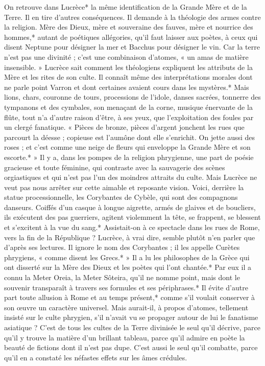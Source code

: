 \documentclass[a4paper, 11pt, oneside, polutonikogreek, french]{article}
\begin{document}
On retrouve dans Lucrèce* la même identification de la Grande Mère et de la Terre. Il en tire d'autres conséquences. Il demande à la théologie des armes contre la religion. Mère des Dieux, mère et souveraine des fauves, mère et nourrice des hommes,* autant de poétiques allégories, qu'il faut laisser aux poètes, à ceux qui disent Neptune pour désigner la mer et Bacchus pour désigner le vin. Car la terre n'est pas une divinité ; c'est une combinaison d'atomes, « un amas de matière insensible. » Lucrèce sait comment les théologiens expliquent les attributs de la Mère et les rites de son culte. Il connaît même des interprétations morales dont ne parle point Varron et dont certaines avaient cours dans les mystères.* Mais lions, chars, couronne de tours, processions de l'idole, danses sacrées, tonnerre des tympanons et des cymbales, son menaçant de la corne, musique énervante de la flûte, tout n'a d'autre raison d'être, à ses yeux, que l'exploitation des foules par un clergé fanatique. « Pièces de bronze, pièces d'argent jonchent les rues que parcourt la déesse ; copieuse est l'aumône dont elle s'enrichit. On jette aussi des roses ; et c'est comme une neige de fleurs qui enveloppe la Grande Mère et son escorte.* » Il y a, dans les pompes de la religion phrygienne, une part de poésie gracieuse et toute féminine, qui contraste avec la sauvagerie des scènes orgiastiques et qui n'est pas l'un des moindres attraits du culte. Mais Lucrèce ne veut pas nous arrêter sur cette aimable et reposante vision. Voici, derrière la statue processionnelle, les Corybantes de Cybèle, qui sont des compagnons danseurs. Coiffés d'un casque à longue aigrette, armés de glaives et de boucliers, ils exécutent des pas guerriers, agitent violemment la tête, se frappent, se blessent et s'excitent à la vue du sang.* Assistait-on à ce spectacle dans les rues de Rome, vers la fin de la République ? Lucrèce, à vrai dire, semble plutôt n'en parler que d'après ses lectures. Il ignore le nom des Corybantes ; il les appelle Curètes phrygiens, « comme disent les Grecs.* » Il a lu les philosophes de la Grèce qui ont disserté sur la Mère des Dieux et les poètes qui l'ont chantée.* Par eux il a connu la Meter Oreia, la Meter Sôteira, qu'il ne nomme point, mais dont le souvenir transparaît à travers ses formules et ses périphrases.* Il évite d'autre part toute allusion à Rome et au temps présent,* comme s'il voulait conserver à son œuvre un caractère universel. Mais aurait-il, à propos d'atomes, tellement insisté sur le culte phrygien, s'il n'avait vu se propager autour de lui le fanatisme asiatique ? C'est de tous les cultes de la Terre divinisée le seul qu'il décrive, parce qu'il y trouve la matière d'un brillant tableau, parce qu'il admire en poète la beauté de fictions dont il n'est pas dupe. C'est aussi le seul qu'il combatte, parce qu'il en a constaté les néfastes effets sur les âmes crédules.
\end{document}
